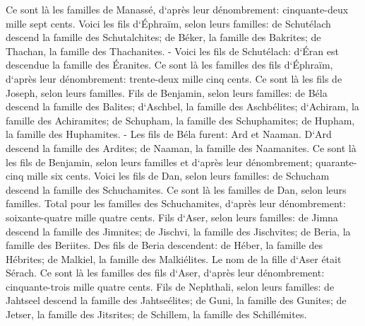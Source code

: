 \verse Ce sont là les familles de Manassé, d`après leur dénombrement: cinquante-deux mille sept cents. 
\verse Voici les fils d`Éphraïm, selon leurs familles: de Schutélach descend la famille des Schutalchites; de Béker, la famille des Bakrites; de Thachan, la famille des Thachanites. - 
\verse Voici les fils de Schutélach: d`Éran est descendue la famille des Éranites. 
\verse Ce sont là les familles des fils d`Éphraïm, d`après leur dénombrement: trente-deux mille cinq cents. Ce sont là les fils de Joseph, selon leurs familles. 
\verse Fils de Benjamin, selon leurs familles: de Béla descend la famille des Balites; d`Aschbel, la famille des Aschbélites; d`Achiram, la famille des Achiramites; 
\verse de Schupham, la famille des Schuphamites; de Hupham, la famille des Huphamites. - 
\verse Les fils de Béla furent: Ard et Naaman. D`Ard descend la famille des Ardites; de Naaman, la famille des Naamanites. 
\verse Ce sont là les fils de Benjamin, selon leurs familles et d`après leur dénombrement; quarante-cinq mille six cents. 
\verse Voici les fils de Dan, selon leurs familles: de Schucham descend la famille des Schuchamites. Ce sont là les familles de Dan, selon leurs familles. 
\verse Total pour les familles des Schuchamites, d`après leur dénombrement: soixante-quatre mille quatre cents. 
\verse Fils d`Aser, selon leurs familles: de Jimna descend la famille des Jimnites; de Jischvi, la famille des Jischvites; de Beria, la famille des Beriites. 
\verse Des fils de Beria descendent: de Héber, la famille des Hébrites; de Malkiel, la famille des Malkiélites. 
\verse Le nom de la fille d`Aser était Sérach. 
\verse Ce sont là les familles des fils d`Aser, d`après leur dénombrement: cinquante-trois mille quatre cents. 
\verse Fils de Nephthali, selon leurs familles: de Jahtseel descend la famille des Jahtseélites; de Guni, la famille des Gunites; 
\verse de Jetser, la famille des Jitsrites; de Schillem, la famille des Schillémites. 
